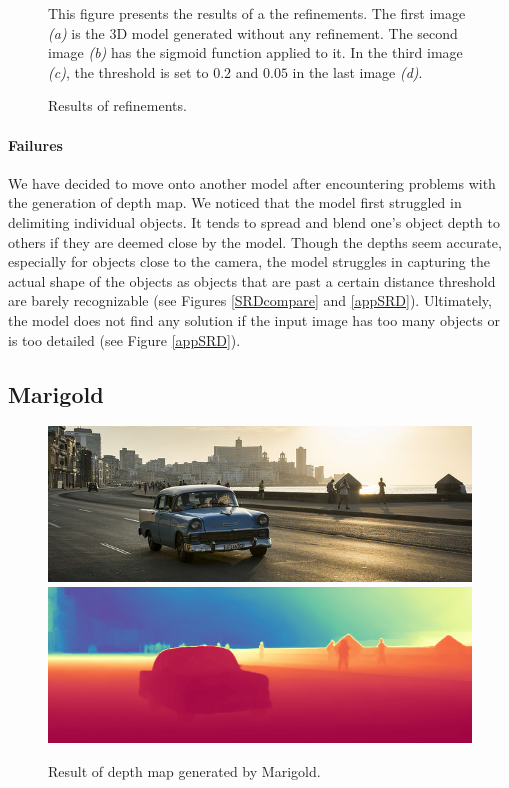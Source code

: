 \documentclass[12pt, letterpaper]{article}
\begin{document}
\begin{spacing}{1.15}
\begin{figure}[!ht]
\begin{center}
        \caption{Results of refinements.}
        \label{Refinements}
    \end{center}
    \small
    This figure presents the results of a the refinements. The first image \emph{(a)} is the 3D model generated without any refinement. The second image \emph{(b)} has the sigmoid function
    applied to it. In the third image \emph{(c)}, the threshold is set to $0.2$ and $0.05$ in the last image \emph{(d)}.
\end{figure}

\paragraph{Failures} We have decided to move onto another model after encountering problems with the generation of depth map. We noticed that the model first struggled in delimiting individual
objects. It tends to spread and blend one's object depth to others if they are deemed close by the model. Though the depths seem accurate, especially for objects close to the camera, the model
struggles in capturing the actual shape of the objects as objects that are past a certain distance threshold are barely recognizable (see Figures \ref{SRDcompare} and \ref{appSRD}).
Ultimately, the model does not find any solution if the input image has too many objects or is too detailed (see Figure \ref{appSRD}).

\subsection{Marigold}

\begin{figure}[hb]
    \begin{center}
        \includegraphics[scale = .33]{test_image}
        \includegraphics[scale = .33]{test_image_pred_colored}
        \caption{Result of depth map generated by Marigold.}
        \label{MRGres}
    \end{center}
\end{figure}


\end{spacing}
\end{document}
